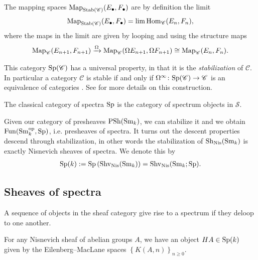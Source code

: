 \documentclass[11pt,openany]{book}
\begin{document}
The mapping spaces $\mathrm{Map}_{\mathrm{Stab}(\mathscr{C})}(E_\bullet, F_\bullet)$ are by definition the limit
\begin{align*}
    \mathrm{Map}_{\mathrm{Stab}(\mathscr{C})}(E_\bullet,F_\bullet) = \lim \mathrm{Hom}_\mathscr{C}(E_n, F_n),
\end{align*}
where the maps in the limit are given by looping and using the structure maps
\begin{align*}
    \mathrm{Map}_\mathscr{C}(E_{n+1}, F_{n+1}) \xrightarrow{\Omega} \mathrm{Map}_{\mathscr{C}}(\Omega E_{n+1}, \Omega F_{n+1}) \cong \mathrm{Map}_{\mathscr{C}}(E_n, F_n).
\end{align*}
%

\begin{remark} This category $\mathrm{Sp}(\mathscr{C})$ has a universal property, in that it is the \textit{stabilization} of $\mathscr{C}$. In particular a category $\mathscr{C}$ is stable if and only if $\Omega^\infty \colon \mathrm{Sp}(\mathscr{C}) \to \mathscr{C}$ is an equivalence of categories \cite[1.4.2.21]{HA}. See \cite[\S1.4.2]{HA} for more details on this construction.
\end{remark}



\begin{example} The classical category of spectra $\mathrm{Sp}$ is the category of spectrum objects in $\mathcal{S}$.
\end{example}

Given our category of presheaves $\mathrm{PSh}(\mathrm{Sm}_k)$, we can stabilize it and we obtain $\mathrm{Fun}(\mathrm{Sm}_k^{\mathrm{op}}, \mathrm{Sp})$, i.e. presheaves of spectra. It turns out the descent properties descend through stabilization, in other words the stabilization of $\mathrm{Sh}_{\mathrm{Nis}}(\mathrm{Sm}_k)$ is exactly Nisnevich sheaves of spectra. We denote this by
%
\begin{align*}
    \mathrm{Sp}(k) := \mathrm{Sp} \left( \mathrm{Shv}_{\mathrm{Nis}}(\mathrm{Sm}_k) \right) = \mathrm{Shv}_{\mathrm{Nis}}(\mathrm{Sm}_k; \mathrm{Sp}).
\end{align*}
%
\subsection{Sheaves of spectra}

A sequence of objects in the sheaf category give rise to a spectrum if they deloop to one another.

\begin{example} For any Nisnevich sheaf of abelian groups $A$, we have an object $HA \in \mathrm{Sp}(k)$ given by the Eilenberg--MacLane spaces $\left\{ K(A,n) \right\}_{n\ge0}$. 
\end{example}
\end{document}
